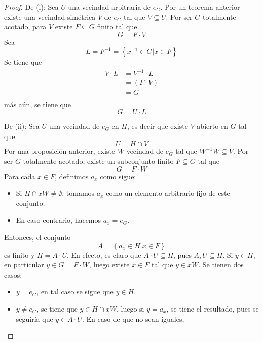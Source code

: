\documentclass[12pt]{report}
\theoremstyle{largebreak}
\begin{document}
    \begin{proof}
        De (i): Sea $U$ una vecindad arbitraria de $e_G$. Por un teorema anterior existe una vecindad simétrica $V$ de $e_G$ tal que $V\subseteq U$. Por ser $G$ totalmente acotado, para $V$ existe $F\subseteq G$ finito tal que
        \begin{equation*}
            G=F\cdot V
        \end{equation*}
        Sea
        \begin{equation*}
            L=F^{-1}=\left\{x^{-1}\in G \Big|x\in F\right\}
        \end{equation*}
        Se tiene que
        \begin{equation*}
            \begin{split}
                V\cdot L&=V^{-1}\cdot L\\
                &=(F\cdot V)\\
                &=G\\
            \end{split}
        \end{equation*}
        más aún, se tiene que
        \begin{equation*}
            G=U\cdot L
        \end{equation*}

        De (ii): Sea $U$ una vecindad de $e_G$ en $H$, es decir que existe $V$ abierto en $G$ tal que
        \begin{equation*}
            U=H\cap V
        \end{equation*}
        Por una proposición anterior, existe $W$ vecindad de $e_G$ tal que $W^{-1}W\subseteq V$. Por ser $G$ totalmente acotado, existe un subconjunto finito $F\subseteq G$ tal que
        \begin{equation*}
            G=F\cdot W
        \end{equation*}
        Para cada $x\in F$, definimos $a_x$ como sigue:
        \begin{itemize}
            \item Si $H\cap xW\neq\emptyset$, tomamos $a_x$ como un elemento arbitrario fijo de este conjunto.
            \item En caso contrario, hacemos $a_x=e_G$.
        \end{itemize} 
        Entonces, el conjunto
        \begin{equation*}
            A=\left\{a_x\in H\Big|x\in F \right\}
        \end{equation*}
        es finito y $H=A\cdot U$. En efecto, es claro que $A\cdot U\subseteq H$, pues $A,U\subseteq H$. Si $y\in H$, en particular $y\in G=F\cdot W$, luego existe $x\in F$ tal que $y\in xW$. Se tienen dos casos:
        \begin{itemize}
            \item $y=e_G$, en tal caso se sigue que $y\in H$.
            \item $y\neq e_G$, se tiene que $y\in H\cap xW$, luego si $y=a_x$, se tiene el resultado, pues se seguiría que $y\in A\cdot U$. En caso de que no sean iguales,
        \end{itemize}
    \end{proof}
\end{document}

